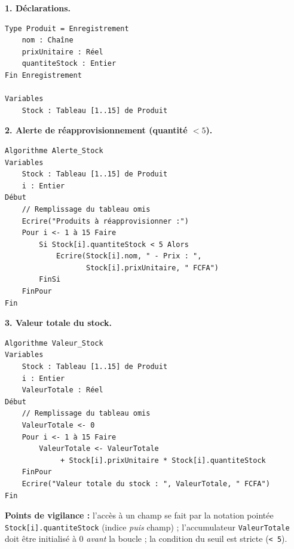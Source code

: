 \documentclass[11pt]{article}
\begin{document}
\begin{corrige}
\textbf{1. Déclarations.}
\begin{lstlisting}
Type Produit = Enregistrement
    nom : Chaîne
    prixUnitaire : Réel
    quantiteStock : Entier
Fin Enregistrement

Variables
    Stock : Tableau [1..15] de Produit
\end{lstlisting}

\textbf{2. Alerte de réapprovisionnement (quantité $< 5$).}
\begin{lstlisting}
Algorithme Alerte_Stock
Variables
    Stock : Tableau [1..15] de Produit
    i : Entier
Début
    // Remplissage du tableau omis
    Ecrire("Produits à réapprovisionner :")
    Pour i <- 1 à 15 Faire
        Si Stock[i].quantiteStock < 5 Alors
            Ecrire(Stock[i].nom, " - Prix : ",
                   Stock[i].prixUnitaire, " FCFA")
        FinSi
    FinPour
Fin
\end{lstlisting}

\textbf{3. Valeur totale du stock.}
\begin{lstlisting}
Algorithme Valeur_Stock
Variables
    Stock : Tableau [1..15] de Produit
    i : Entier
    ValeurTotale : Réel
Début
    // Remplissage du tableau omis
    ValeurTotale <- 0
    Pour i <- 1 à 15 Faire
        ValeurTotale <- ValeurTotale
             + Stock[i].prixUnitaire * Stock[i].quantiteStock
    FinPour
    Ecrire("Valeur totale du stock : ", ValeurTotale, " FCFA")
Fin
\end{lstlisting}

\textbf{Points de vigilance :} l'accès à un champ se fait par la notation pointée \texttt{Stock[i].quantiteStock} (indice \emph{puis} champ) ; l'accumulateur \texttt{ValeurTotale} doit être initialisé à 0 \emph{avant} la boucle ; la condition du seuil est stricte (\texttt{< 5}).
\end{corrige}
\end{document}
